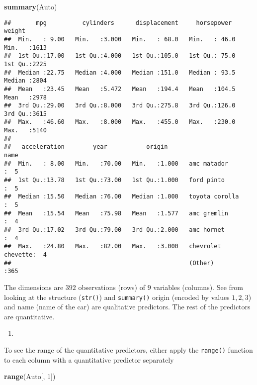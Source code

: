 \documentclass[
]{article}
\newenvironment{Shaded}{\begin{snugshade}}{\end{snugshade}}
\newcommand{\DecValTok}[1]{\textcolor[rgb]{0.00,0.00,0.81}{#1}}
\newcommand{\FunctionTok}[1]{\textcolor[rgb]{0.13,0.29,0.53}{\textbf{#1}}}
\newcommand{\NormalTok}[1]{#1}
\providecommand{\tightlist}{%
  \setlength{\itemsep}{0pt}\setlength{\parskip}{0pt}}
\begin{document}
\begin{Shaded}
\begin{Highlighting}[]
\FunctionTok{summary}\NormalTok{(Auto)}
\end{Highlighting}
\end{Shaded}

\begin{verbatim}
##       mpg          cylinders      displacement     horsepower        weight    
##  Min.   : 9.00   Min.   :3.000   Min.   : 68.0   Min.   : 46.0   Min.   :1613  
##  1st Qu.:17.00   1st Qu.:4.000   1st Qu.:105.0   1st Qu.: 75.0   1st Qu.:2225  
##  Median :22.75   Median :4.000   Median :151.0   Median : 93.5   Median :2804  
##  Mean   :23.45   Mean   :5.472   Mean   :194.4   Mean   :104.5   Mean   :2978  
##  3rd Qu.:29.00   3rd Qu.:8.000   3rd Qu.:275.8   3rd Qu.:126.0   3rd Qu.:3615  
##  Max.   :46.60   Max.   :8.000   Max.   :455.0   Max.   :230.0   Max.   :5140  
##                                                                                
##   acceleration        year           origin                      name    
##  Min.   : 8.00   Min.   :70.00   Min.   :1.000   amc matador       :  5  
##  1st Qu.:13.78   1st Qu.:73.00   1st Qu.:1.000   ford pinto        :  5  
##  Median :15.50   Median :76.00   Median :1.000   toyota corolla    :  5  
##  Mean   :15.54   Mean   :75.98   Mean   :1.577   amc gremlin       :  4  
##  3rd Qu.:17.02   3rd Qu.:79.00   3rd Qu.:2.000   amc hornet        :  4  
##  Max.   :24.80   Max.   :82.00   Max.   :3.000   chevrolet chevette:  4  
##                                                  (Other)           :365
\end{verbatim}

The dimensions are \(392\) observations (rows) of \(9\) variables
(columns). See from looking at the structure (\texttt{str()}) and
\texttt{summary()} origin (encoded by values \(1,2,3\)) and name (name
of the car) are qualitative predictors. The rest of the predictors are
quantitative.

\begin{enumerate}
\def\labelenumi{\alph{enumi})}
\setcounter{enumi}{1}
\tightlist
\item
\end{enumerate}

To see the range of the quantitative predictors, either apply the
\texttt{range()} function to each column with a quantitative predictor
separately

\begin{Shaded}
\begin{Highlighting}[]
\FunctionTok{range}\NormalTok{(Auto[, }\DecValTok{1}\NormalTok{])}
\end{Highlighting}
\end{Shaded}
\end{document}

